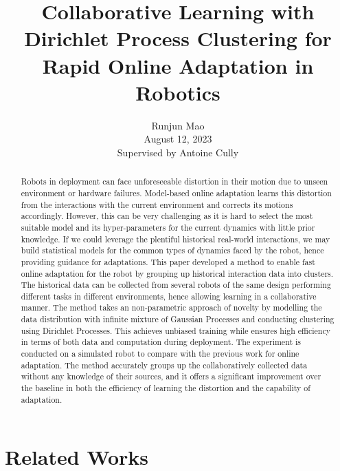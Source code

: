 \documentclass[journal]{IEEEtran}
\title{Collaborative Learning with Dirichlet Process Clustering for Rapid Online Adaptation in Robotics}
\author{Runjun Mao \\ August 12, 2023 \\ Supervised by Antoine Cully}
\begin{document}
\maketitle

\begin{abstract}
\noindent
Robots in deployment can face unforeseeable distortion in their motion due to unseen environment or hardware failures. 
Model-based online adaptation learns this distortion from the interactions with the current environment and corrects its motions accordingly. However, this can be very challenging as it is hard to select the most suitable model and its hyper-parameters for the current dynamics with little prior knowledge.
If we could leverage the plentiful historical real-world interactions, we may build statistical models for the common types of dynamics faced by the robot, hence providing guidance for adaptations. 
This paper developed a method to enable fast online adaptation for the robot by grouping up historical  interaction data into clusters. 
The historical data can be collected from several robots of the same design performing different tasks in different environments, hence allowing learning in a collaborative manner. 
The method takes an non-parametric approach of novelty by modelling the data distribution with infinite mixture of Gaussian Processes and conducting clustering using Dirichlet Processes. 
This achieves unbiased training while ensures high efficiency in terms of both data and computation during deployment. 
The experiment is conducted on a simulated robot to compare with the previous work for online adaptation. 
The method accurately groups up the collaboratively collected data without any knowledge of their sources, and it offers a significant improvement over the baseline in both the efficiency of learning the distortion and the capability of adaptation. 

\end{abstract}





\section{Related Works}
\end{document}

